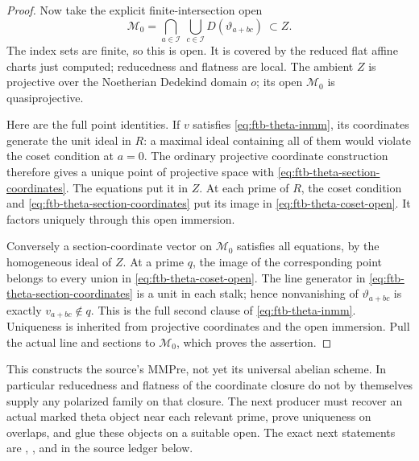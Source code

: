 \begin{proof}
Now take the explicit finite-intersection open
\[
 \mathcal M_0=
      \bigcap_{a\in\mathcal I}
          \ \bigcup_{c\in\mathcal I}D(\vartheta_{a+bc})
                                           \ \subset Z.
 \tag{M5}\label{eq:ftb-theta-coset-open}
\]
The index sets are finite, so this is open.
It is covered by the reduced flat affine charts just
computed; reducedness and flatness are local.
The ambient \(Z\) is projective over the Noetherian
Dedekind domain \(o\); its open \(\mathcal M_0\) is
quasiprojective.

Here are the full point identities.
If \(v\) satisfies \eqref{eq:ftb-theta-inmm}, its coordinates
generate the unit ideal in \(R\): a maximal ideal
containing all of them would violate the coset condition
at \(a=0\).
The ordinary projective coordinate construction therefore
gives a unique point of projective space with
\eqref{eq:ftb-theta-section-coordinates}.
The equations put it in \(Z\).
At each prime of \(R\), the coset condition and
\eqref{eq:ftb-theta-section-coordinates} put its image in
\eqref{eq:ftb-theta-coset-open}.
It factors uniquely through this open immersion.

Conversely a section-coordinate vector on \(\mathcal M_0\)
satisfies all equations, by the homogeneous ideal of \(Z\).
At a prime \(q\), the image of the corresponding point
belongs to every union in
\eqref{eq:ftb-theta-coset-open}.
The line generator in \eqref{eq:ftb-theta-section-coordinates}
is a unit in each stalk; hence nonvanishing of
\(\vartheta_{a+bc}\) is exactly \(v_{a+bc}\notin q\).
This is the full second clause of
\eqref{eq:ftb-theta-inmm}.
Uniqueness is inherited from projective coordinates and
the open immersion.  Pull the actual line and sections
to \(\mathcal M_0\), which proves the assertion.
\end{proof}

This constructs the source's \(\mathrm{MMPre}\), not yet
its universal abelian scheme.
In particular reducedness and flatness of the coordinate
closure do not by themselves supply any polarized family
on that closure.
The next producer must recover an actual marked theta
object near each relevant prime, prove uniqueness on
overlaps, and glue these objects on a suitable open.
The exact next statements are
,
, and
 in the source ledger
below.

